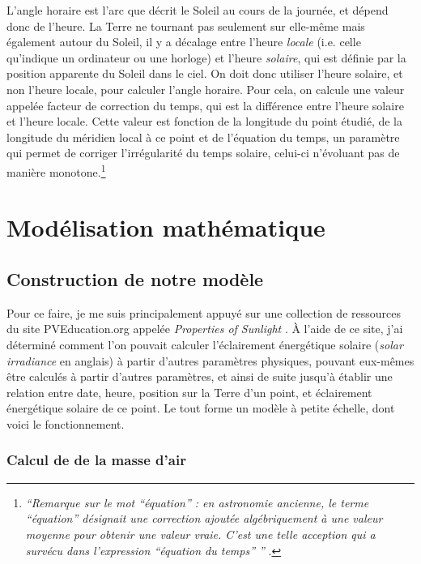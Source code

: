 \documentclass[12pt]{article}
\begin{document}
L'angle horaire est l'arc que décrit le Soleil au cours de la journée, et dépend donc de l'heure.
La Terre ne tournant pas seulement sur elle-même mais également autour du Soleil, il y a décalage entre l'heure \emph{locale} (i.e. celle qu'indique un ordinateur ou une horloge) et l'heure \emph{solaire}, qui est définie par la position apparente du Soleil dans le ciel.
On doit donc utiliser l'heure solaire, et non l'heure locale, pour calculer l'angle horaire.
Pour cela, on calcule une valeur appelée facteur de correction du temps, qui est la différence entre l'heure solaire et l'heure locale.
Cette valeur est fonction de la longitude du point étudié, de la longitude du méridien local à ce point et de l'équation du temps, un paramètre qui permet de corriger l'irrégularité du temps solaire, celui-ci n'évoluant pas de manière monotone.\footnote{\textit{``Remarque sur le mot ``équation'' : en astronomie ancienne, le terme ``équation'' désignait une correction ajoutée algébriquement à une valeur moyenne pour obtenir une valeur vraie.
C'est une telle acception qui a survécu dans l'expression ``équation du temps'' ''} \cite{equation_temps_wiki}.}



\clearpage
\section{Modélisation mathématique}
\subsection{Construction de notre modèle}

Pour ce faire, je me suis principalement appuyé sur une collection de ressources du site PVEducation.org appelée \emph{Properties of Sunlight} \cite{properties_of_sunlight}.
À l'aide de ce site, j'ai déterminé comment l'on pouvait calculer l'éclairement énergétique solaire (\textit{solar irradiance} en anglais) à partir d'autres paramètres physiques, pouvant eux-mêmes être calculés à partir d'autres paramètres, et ainsi de suite jusqu'à établir une relation entre date, heure, position sur la Terre d'un point, et éclairement énergétique solaire de ce point.
Le tout forme un modèle à petite échelle, dont voici le fonctionnement.

\subsubsection{Calcul de de la masse d'air}
\end{document}
